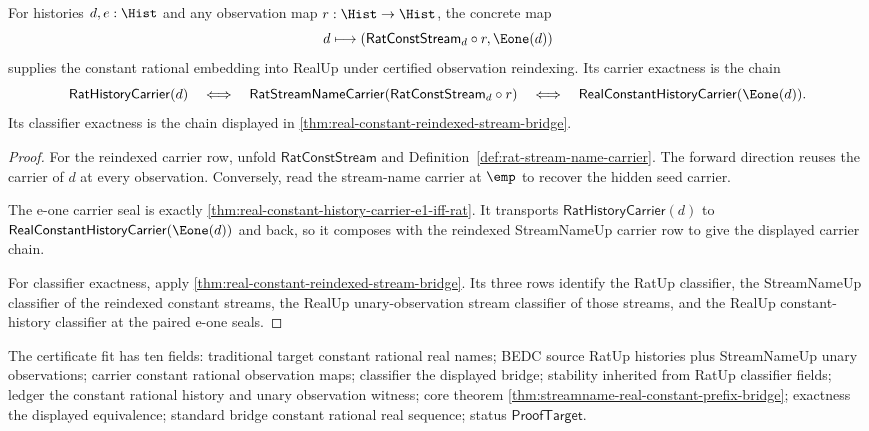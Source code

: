 \begin{theorem}
\label{thm:real-reindexed-constant-rational-embedding-certificate}
For histories $d,e:\Hist$ and any observation map $r:\Hist\to\Hist$, the
concrete map
$$
d\longmapsto (\mathsf{RatConstStream}_d\circ r,\Eone(d))
$$
supplies the constant rational embedding into RealUp under certified
observation reindexing. Its carrier exactness is the chain
$$
\mathsf{RatHistoryCarrier}(d)
\quad\Longleftrightarrow\quad
\mathsf{RatStreamNameCarrier}(\mathsf{RatConstStream}_d\circ r)
\quad\Longleftrightarrow\quad
\mathsf{RealConstantHistoryCarrier}(\Eone(d)).
$$
Its classifier exactness is the chain displayed in
\autoref{thm:real-constant-reindexed-stream-bridge}.
\end{theorem}
\begin{proof}
For the reindexed carrier row, unfold $\mathsf{RatConstStream}$ and
Definition~\ref{def:rat-stream-name-carrier}. The forward direction reuses the
carrier of $d$ at every observation. Conversely, read the stream-name carrier at
$\emp$ to recover the hidden seed carrier.

The e-one carrier seal is exactly
\autoref{thm:real-constant-history-carrier-e1-iff-rat}. It transports
$\mathsf{RatHistoryCarrier}(d)$ to
$\mathsf{RealConstantHistoryCarrier}(\Eone(d))$ and back, so it composes with
the reindexed StreamNameUp carrier row to give the displayed carrier chain.

For classifier exactness, apply
\autoref{thm:real-constant-reindexed-stream-bridge}. Its three rows identify the
RatUp classifier, the StreamNameUp classifier of the reindexed constant streams,
the RealUp unary-observation stream classifier of those streams, and the RealUp
constant-history classifier at the paired e-one seals.
\end{proof}

The certificate fit has ten fields: traditional target constant rational real
names; BEDC source RatUp histories plus StreamNameUp unary observations; carrier
constant rational observation maps; classifier the displayed bridge; stability
inherited from RatUp classifier fields; ledger the constant rational history and
unary observation witness; core theorem
\autoref{thm:streamname-real-constant-prefix-bridge}; exactness the displayed
equivalence; standard bridge constant rational real sequence; status
$\mathsf{ProofTarget}$.

